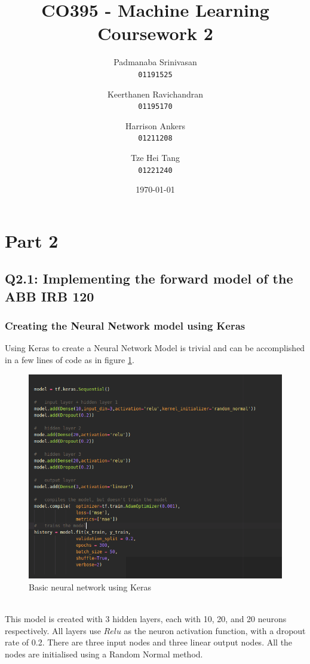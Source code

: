 \documentclass{article}
\title{CO395 - Machine Learning Coursework 2}
\author{
    Padmanaba Srinivasan \\
    \texttt{01191525}
    \and
    Keerthanen Ravichandran \\
    \texttt{01195170}
    \and
    Harrison Ankers \\
    \texttt{01211208}
    \and
    Tze Hei Tang \\
    \texttt{01221240}
}
\date{\today}
\begin{document}
\maketitle
\newpage
\tableofcontents
\newpage

\section{Part 2}
\subsection{Q2.1: Implementing the forward model of the ABB IRB 120}
\subsubsection{Creating the Neural Network model using Keras}
Using Keras to create a Neural Network Model is trivial and can be accomplished in a few lines of code as in figure \ref{fig:keras_nn_code}.
\begin{figure}[h]
    \centering
    \includegraphics[scale=0.5]{figure/basic_model.png}
    \caption{Basic neural network using Keras}
    \label{fig:keras_nn_code}
\end{figure}
\\

This model is created with 3 hidden layers, each with 10, 20, and 20 neurons respectively. All layers use $Relu$ as the neuron activation function, with a dropout rate of 0.2. There are three input nodes and three linear output nodes. All the nodes are initialised using a Random Normal method. 
\end{document}
